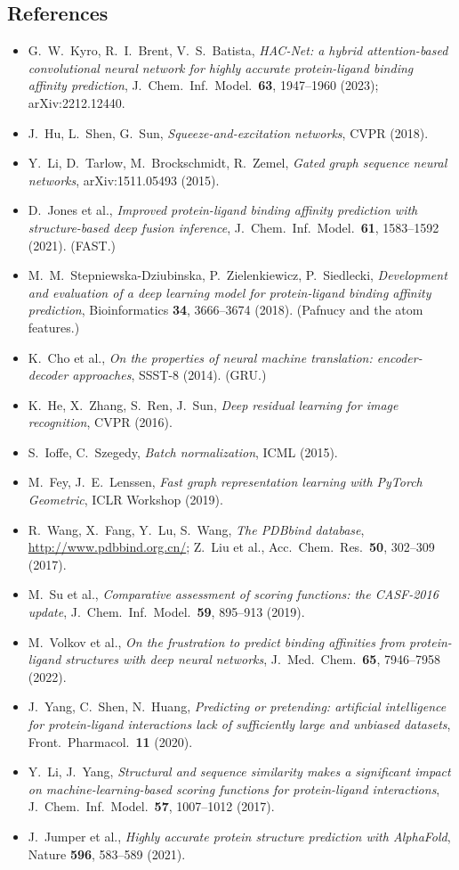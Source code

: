 \documentclass[11pt]{article}
\begin{document}
\subsection*{References}
{\small\sloppy
\begin{itemize}[nosep, leftmargin=1.2em]
  \item G.~W.~Kyro, R.~I.~Brent, V.~S.~Batista, \textit{HAC-Net: a hybrid attention-based convolutional neural network for highly accurate protein-ligand binding affinity prediction}, J.\ Chem.\ Inf.\ Model.\ \textbf{63}, 1947--1960 (2023); arXiv:2212.12440.
  \item J.~Hu, L.~Shen, G.~Sun, \textit{Squeeze-and-excitation networks}, CVPR (2018).
  \item Y.~Li, D.~Tarlow, M.~Brockschmidt, R.~Zemel, \textit{Gated graph sequence neural networks}, arXiv:1511.05493 (2015).
  \item D.~Jones et al., \textit{Improved protein-ligand binding affinity prediction with structure-based deep fusion inference}, J.\ Chem.\ Inf.\ Model.\ \textbf{61}, 1583--1592 (2021). (FAST.)
  \item M.~M.~Stepniewska-Dziubinska, P.~Zielenkiewicz, P.~Siedlecki, \textit{Development and evaluation of a deep learning model for protein-ligand binding affinity prediction}, Bioinformatics \textbf{34}, 3666--3674 (2018). (Pafnucy and the atom features.)
  \item K.~Cho et al., \textit{On the properties of neural machine translation: encoder-decoder approaches}, SSST-8 (2014). (GRU.)
  \item K.~He, X.~Zhang, S.~Ren, J.~Sun, \textit{Deep residual learning for image recognition}, CVPR (2016).
  \item S.~Ioffe, C.~Szegedy, \textit{Batch normalization}, ICML (2015).
  \item M.~Fey, J.~E.~Lenssen, \textit{Fast graph representation learning with PyTorch Geometric}, ICLR Workshop (2019).
  \item R.~Wang, X.~Fang, Y.~Lu, S.~Wang, \textit{The PDBbind database}, \url{http://www.pdbbind.org.cn/}; Z.~Liu et al., Acc.\ Chem.\ Res.\ \textbf{50}, 302--309 (2017).
  \item M.~Su et al., \textit{Comparative assessment of scoring functions: the CASF-2016 update}, J.\ Chem.\ Inf.\ Model.\ \textbf{59}, 895--913 (2019).
  \item M.~Volkov et al., \textit{On the frustration to predict binding affinities from protein-ligand structures with deep neural networks}, J.\ Med.\ Chem.\ \textbf{65}, 7946--7958 (2022).
  \item J.~Yang, C.~Shen, N.~Huang, \textit{Predicting or pretending: artificial intelligence for protein-ligand interactions lack of sufficiently large and unbiased datasets}, Front.\ Pharmacol.\ \textbf{11} (2020).
  \item Y.~Li, J.~Yang, \textit{Structural and sequence similarity makes a significant impact on machine-learning-based scoring functions for protein-ligand interactions}, J.\ Chem.\ Inf.\ Model.\ \textbf{57}, 1007--1012 (2017).
  \item J.~Jumper et al., \textit{Highly accurate protein structure prediction with AlphaFold}, Nature \textbf{596}, 583--589 (2021).
\end{itemize}}
\end{document}
